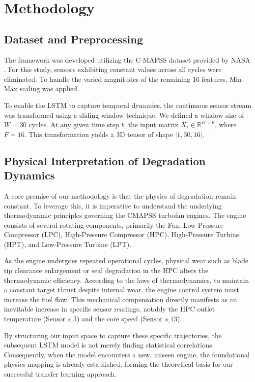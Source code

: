 \documentclass[journal]{IEEEtran}
\begin{document}
\section{Methodology}

\subsection{Dataset and Preprocessing}
The framework was developed utilizing the C-MAPSS dataset provided by NASA \cite{saxena2008}. For this study, sensors exhibiting constant values across all cycles were eliminated. To handle the varied magnitudes of the remaining 16 features, Min-Max scaling was applied.

To enable the LSTM to capture temporal dynamics, the continuous sensor stream was transformed using a sliding window technique. We defined a window size of $W=30$ cycles. At any given time step $t$, the input matrix $X_t\in\mathbb{R}^{W\times F}$, where $F=16$. This transformation yields a 3D tensor of shape $|1,30,16|$.

\subsection{Physical Interpretation of Degradation Dynamics}
A core premise of our methodology is that the physics of degradation remain constant. To leverage this, it is imperative to understand the underlying thermodynamic principles governing the CMAPSS turbofan engines. The engine consists of several rotating components, primarily the Fan, Low-Pressure Compressor (LPC), High-Pressure Compressor (HPC), High-Pressure Turbine (HPT), and Low-Pressure Turbine (LPT).

As the engine undergoes repeated operational cycles, physical wear such as blade tip clearance enlargement or seal degradation in the HPC alters the thermodynamic efficiency. According to the laws of thermodynamics, to maintain a constant target thrust despite internal wear, the engine control system must increase the fuel flow. This mechanical compensation directly manifests as an inevitable increase in specific sensor readings, notably the HPC outlet temperature (Sensor $s\_3$) and the core speed (Sensor $s\_13$). 

By structuring our input space to capture these specific trajectories, the subsequent LSTM model is not merely finding statistical correlations. Consequently, when the model encounters a new, unseen engine, the foundational physics mapping is already established, forming the theoretical basis for our successful transfer learning approach.
\end{document}
